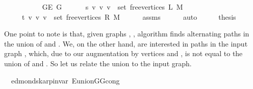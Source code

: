 \begin{isabellebody}
\ \ \ \ {\isachardoublequoteopen}{\isachardot}{\kern0pt}{\isachardot}{\kern0pt}{\isachardot}{\kern0pt}\ {\isacharequal}{\kern0pt}\isanewline
\ \ \ \ \ G{\isachardot}{\kern0pt}E\ G\ {\isasymunion}\isanewline
\ \ \ \ \ {\isacharbraceleft}{\kern0pt}{\isacharbraceleft}{\kern0pt}s{\isacharcomma}{\kern0pt}\ v{\isacharbraceright}{\kern0pt}\ {\isacharbar}{\kern0pt}v{\isachardot}{\kern0pt}\ v\ {\isasymin}\ set\ {\isacharparenleft}{\kern0pt}free{\isacharunderscore}{\kern0pt}vertices\ L\ M{\isacharparenright}{\kern0pt}{\isacharbraceright}{\kern0pt}\ {\isasymunion}\isanewline
\ \ \ \ \ {\isacharbraceleft}{\kern0pt}{\isacharbraceleft}{\kern0pt}t{\isacharcomma}{\kern0pt}\ v{\isacharbraceright}{\kern0pt}\ {\isacharbar}{\kern0pt}v{\isachardot}{\kern0pt}\ v\ {\isasymin}\ set\ {\isacharparenleft}{\kern0pt}free{\isacharunderscore}{\kern0pt}vertices\ R\ M{\isacharparenright}{\kern0pt}{\isacharbraceright}{\kern0pt}{\isachardoublequoteclose}\isanewline
\ \ \ \ \isamarkupfalse%
\ assms{\isacharparenleft}{\kern0pt}{}{\isacharparenright}{\kern0pt}\isanewline
\ \ \ \ \isamarkupfalse%
\ auto\isanewline
\ \ \isamarkupfalse%
\ \isamarkupfalse%
\ {\isacharquery}{\kern0pt}thesis\isanewline
\ \ \ \ \isacommand{{\isachardot}{\kern0pt}}\isamarkupfalse%
\isanewline
{}\isamarkupfalse%
%
\endisatagproof
{\isafoldproof}%
%
\isadelimproof
%
\endisadelimproof
%
\begin{isamarkuptext}%
One point to note is that, given graphs , , algorithm
 finds alternating paths in the union of  and
. We, on the other hand, are interested in paths in the input graph
, which, due to our augmentation by vertices  and , is not equal to the
union of  and . So let us relate the union to the
input graph.%
\end{isamarkuptext}\isamarkuptrue%
\isamarkupfalse%
\ {\isacharparenleft}{\kern0pt}\ edmonds{\isacharunderscore}{\kern0pt}karp{\isacharunderscore}{\kern0pt}invar{\isacharparenright}{\kern0pt}\ E{\isacharunderscore}{\kern0pt}union{\isacharunderscore}{\kern0pt}G{}{\isacharunderscore}{\kern0pt}G{}{\isacharunderscore}{\kern0pt}cong{\isacharcolon}{\kern0pt}\isanewline

\end{isabellebody}

